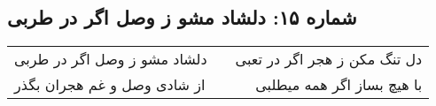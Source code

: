 \begin{center}
\section*{شماره ۱۵: دلشاد مشو ز وصل اگر در طربی}
\label{sec:015}
\begin{longtable}{l p{0.5cm} r}
دلشاد مشو ز وصل اگر در طربی
&&
دل تنگ مکن ز هجر اگر در تعبی
\\
از شادی وصل و غم هجران بگذر
&&
با هیچ بساز اگر همه میطلبی
\\
\end{longtable}
\end{center}
